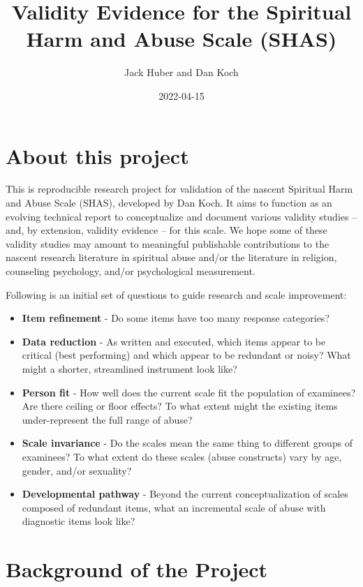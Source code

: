\documentclass[
]{report}
\title{Validity Evidence for the Spiritual Harm and Abuse Scale (SHAS)}
\author{Jack Huber and Dan Koch}
\date{2022-04-15}
\providecommand{\tightlist}{%
  \setlength{\itemsep}{0pt}\setlength{\parskip}{0pt}}
\begin{document}
\maketitle

{
\setcounter{tocdepth}{1}
\tableofcontents
}
\hypertarget{about-this-project}{%
\chapter{About this project}\label{about-this-project}}

This is reproducible research project for validation of the nascent Spiritual Harm and Abuse Scale (SHAS), developed by Dan Koch. It aims to function as an evolving technical report to conceptualize and document various validity studies -- and, by extension, validity evidence -- for this scale. We hope some of these validity studies may amount to meaningful publishable contributions to the nascent research literature in spiritual abuse and/or the literature in religion, counseling psychology, and/or psychological measurement.

Following is an initial set of questions to guide research and scale improvement:

\begin{itemize}
\tightlist
\item
  \textbf{Item refinement} - Do some items have too many response categories?
\item
  \textbf{Data reduction} - As written and executed, which items appear to be critical (best performing) and which appear to be redundant or noisy? What might a shorter, streamlined instrument look like?
\item
  \textbf{Person fit} - How well does the current scale fit the population of examinees? Are there ceiling or floor effects? To what extent might the existing items under-represent the full range of abuse?
\item
  \textbf{Scale invariance} - Do the scales mean the same thing to different groups of examinees? To what extent do these scales (abuse constructs) vary by age, gender, and/or sexuality?
\item
  \textbf{Developmental pathway} - Beyond the current conceptualization of scales composed of redundant items, what an incremental scale of abuse with diagnostic items look like?
\end{itemize}

\hypertarget{background-of-the-project}{%
\chapter{Background of the Project}\label{background-of-the-project}}
\end{document}
